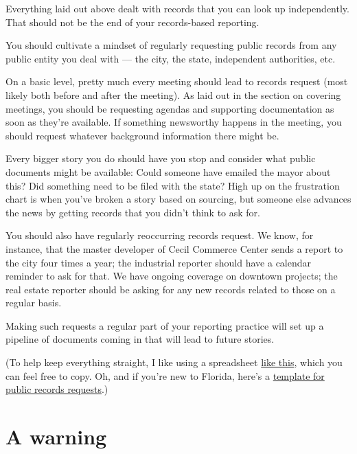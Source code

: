 \documentclass[
  11pt,
  american,
  letterpaperpaper,
  extrafontsizes,onecolumn,openright
  ]{memoir}
\begin{document}
Everything laid out above dealt with records that you can look up independently. That should not be the end of your records-based reporting.

You should cultivate a mindset of regularly requesting public records from any public entity you deal with --- the city, the state, independent authorities, etc.

On a basic level, pretty much every meeting should lead to records request (most likely both before and after the meeting). As laid out in the section on covering meetings, you should be requesting agendas and supporting documentation as soon as they're available. If something newsworthy happens in the meeting, you should request whatever background information there might be.

Every bigger story you do should have you stop and consider what public documents might be available: Could someone have emailed the mayor about this? Did something need to be filed with the state? High up on the frustration chart is when you've broken a story based on sourcing, but someone else advances the news by getting records that you didn't think to ask for.

You should also have regularly reoccurring records request. We know, for instance, that the master developer of Cecil Commerce Center sends a report to the city four times a year; the industrial reporter should have a calendar reminder to ask for that. We have ongoing coverage on downtown projects; the real estate reporter should be asking for any new records related to those on a regular basis.

Making such requests a regular part of your reporting practice will set up a pipeline of documents coming in that will lead to future stories.

(To help keep everything straight, I like using a spreadsheet \href{https://acbj-my.sharepoint.com/:x:/g/personal/tgibbons_bizjournals_com/Ea65ng1GEW9OqWxEPRx1TzkBMyipS5wkbaYueyRBy6mmkw?e=NFxJmG}{like this}, which you can feel free to copy. Oh, and if you're new to Florida, here's a \href{https://acbj-my.sharepoint.com/:w:/g/personal/tgibbons_bizjournals_com/EfD3WnLQ15tHl5L4WWqUNpcBazng7XTyUZ-0wdpofYVfyQ?e=xzp1Bf}{template for public records requests}.)

\hypertarget{a-warning}{%
\section*{A warning}\label{a-warning}}
\end{document}
